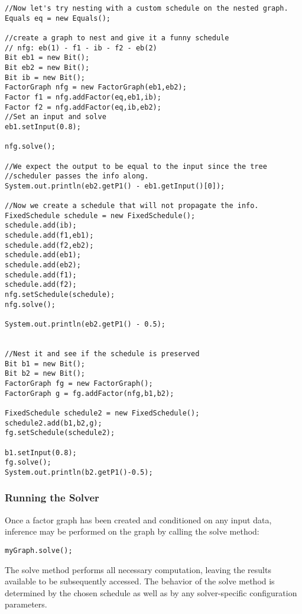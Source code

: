 \fi

\ifjava

\begin{lstlisting}
//Now let's try nesting with a custom schedule on the nested graph.
Equals eq = new Equals();
	
//create a graph to nest and give it a funny schedule    
// nfg: eb(1) - f1 - ib - f2 - eb(2)
Bit eb1 = new Bit();
Bit eb2 = new Bit();
Bit ib = new Bit();
FactorGraph nfg = new FactorGraph(eb1,eb2);
Factor f1 = nfg.addFactor(eq,eb1,ib);
Factor f2 = nfg.addFactor(eq,ib,eb2);
//Set an input and solve
eb1.setInput(0.8);

nfg.solve();

//We expect the output to be equal to the input since the tree
//scheduler passes the info along.
System.out.println(eb2.getP1() - eb1.getInput()[0]);

//Now we create a schedule that will not propagate the info.
FixedSchedule schedule = new FixedSchedule();
schedule.add(ib);
schedule.add(f1,eb1);
schedule.add(f2,eb2);
schedule.add(eb1);
schedule.add(eb2);
schedule.add(f1);
schedule.add(f2);
nfg.setSchedule(schedule);
nfg.solve();

System.out.println(eb2.getP1() - 0.5);

		
//Nest it and see if the schedule is preserved
Bit b1 = new Bit();
Bit b2 = new Bit();
FactorGraph fg = new FactorGraph();
FactorGraph g = fg.addFactor(nfg,b1,b2);

FixedSchedule schedule2 = new FixedSchedule();
schedule2.add(b1,b2,g);
fg.setSchedule(schedule2);

b1.setInput(0.8);		
fg.solve();
System.out.println(b2.getP1()-0.5);

\end{lstlisting}

\fi

\subsubsection{Running the Solver}

Once a factor graph has been created and conditioned on any input data, inference may be performed on the graph by calling the solve method:

\begin{lstlisting}
myGraph.solve();
\end{lstlisting}

The solve method performs all necessary computation, leaving the results available to be subsequently accessed.  The behavior of the solve method is determined by the chosen schedule as well as by any solver-specific configuration parameters.

